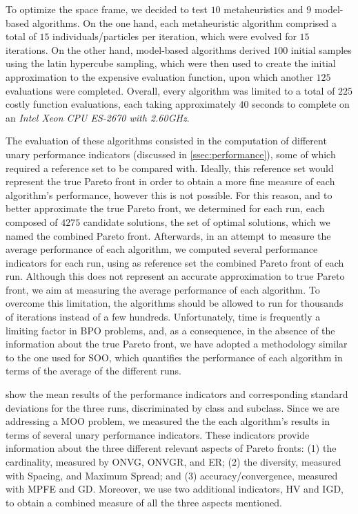 To optimize the space frame, we decided to test $10$ metaheuristics and $9$ model-based algorithms. On the one hand, each metaheuristic algorithm comprised a total of $15$ individuals/particles per iteration, which were evolved for $15$ iterations. On the other hand, model-based algorithms derived $100$ initial samples using the latin hypercube sampling, which were then used to create the initial approximation to the expensive evaluation function, upon which another $125$ evaluations were completed. Overall, every algorithm was limited to a total of $225$ costly function evaluations, each taking approximately $40$ seconds to complete on an \textit{Intel Xeon CPU ES-2670 with 2.60GHz}. 

The evaluation of these algorithms consisted in the computation of different unary performance indicators (discussed in \cref{ssec:performance}), some of which required a reference set to be compared with. Ideally, this reference set would represent the true Pareto front in order to obtain a more fine measure of each algorithm's performance, however this is not possible. For this reason, and to better approximate the true Pareto front, we determined for each run, each composed of $4275$ candidate solutions, the set of optimal solutions, which we named the combined Pareto front. Afterwards, in an attempt to measure the average performance of each algorithm, we computed several performance indicators for each run, using as reference set the combined Pareto front of each run. Although this does not represent an accurate approximation to true Pareto front, we aim at measuring the average performance of each algorithm. To overcome this limitation, the algorithms should be allowed to run for thousands of iterations instead of a few hundreds. Unfortunately, time is frequently a limiting factor in \ac{BPO} problems, and, as a consequence, in the absence of the information about the true Pareto front, we have adopted a methodology similar to the one used for \ac{SOO}, which quantifies the performance of each algorithm in terms of the average of the different runs. 

 show the mean results of the performance indicators and corresponding standard deviations for the three runs, discriminated by class and subclass. Since we are addressing a \ac{MOO} problem, we measured the the each algorithm's results in terms of several unary performance indicators. These indicators provide information about the three different relevant aspects of Pareto fronts: (1) the cardinality, measured by \ac{ONVG}, \ac{ONVGR}, and \ac{ER}; (2) the diversity, measured with Spacing, and Maximum Spread; and (3) accuracy/convergence, measured with \ac{MPFE} and \ac{GD}. Moreover, we use two additional indicators, \ac{HV} and \ac{IGD}, to obtain a combined measure of all the three aspects mentioned. %

